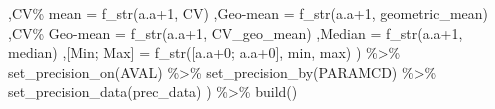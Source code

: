 \documentclass[
  letterpaper,
  DIV=11,
  numbers=noendperiod]{scrreprt}
\newenvironment{Shaded}{\begin{snugshade}}{\end{snugshade}}
\newcommand{\FunctionTok}[1]{\textcolor[rgb]{0.28,0.35,0.67}{#1}}
\newcommand{\NormalTok}[1]{\textcolor[rgb]{0.00,0.23,0.31}{#1}}
\newcommand{\OtherTok}[1]{\textcolor[rgb]{0.00,0.23,0.31}{#1}}
\newcommand{\SpecialCharTok}[1]{\textcolor[rgb]{0.37,0.37,0.37}{#1}}
\newcommand{\StringTok}[1]{\textcolor[rgb]{0.13,0.47,0.30}{#1}}
\begin{document}
\begin{Shaded}
\begin{Highlighting}[]
\NormalTok{          ,}\StringTok{\textquotesingle{}CV\% mean\textquotesingle{}}     \OtherTok{=} \FunctionTok{f\_str}\NormalTok{(}\StringTok{\textquotesingle{}a.a+1\textquotesingle{}}\NormalTok{, CV)}
\NormalTok{          ,}\StringTok{\textquotesingle{}Geo{-}mean\textquotesingle{}}     \OtherTok{=} \FunctionTok{f\_str}\NormalTok{(}\StringTok{\textquotesingle{}a.a+1\textquotesingle{}}\NormalTok{, geometric\_mean)}
\NormalTok{          ,}\StringTok{\textquotesingle{}CV\% Geo{-}mean\textquotesingle{}} \OtherTok{=} \FunctionTok{f\_str}\NormalTok{(}\StringTok{\textquotesingle{}a.a+1\textquotesingle{}}\NormalTok{, CV\_geo\_mean)}
\NormalTok{          ,}\StringTok{\textquotesingle{}Median\textquotesingle{}}       \OtherTok{=} \FunctionTok{f\_str}\NormalTok{(}\StringTok{\textquotesingle{}a.a+1\textquotesingle{}}\NormalTok{, median)}
\NormalTok{          ,}\StringTok{\textquotesingle{}[Min; Max]\textquotesingle{}}   \OtherTok{=} \FunctionTok{f\_str}\NormalTok{(}\StringTok{\textquotesingle{}[a.a+0; a.a+0]\textquotesingle{}}\NormalTok{, min, max)}
\NormalTok{        ) }\SpecialCharTok{\%\textgreater{}\%} 
        \FunctionTok{set\_precision\_on}\NormalTok{(AVAL) }\SpecialCharTok{\%\textgreater{}\%} 
        \FunctionTok{set\_precision\_by}\NormalTok{(PARAMCD) }\SpecialCharTok{\%\textgreater{}\%}
        \FunctionTok{set\_precision\_data}\NormalTok{(prec\_data)}
\NormalTok{    ) }\SpecialCharTok{\%\textgreater{}\%}
    \FunctionTok{build}\NormalTok{()}


\end{Highlighting}
\end{Shaded}
\end{document}
